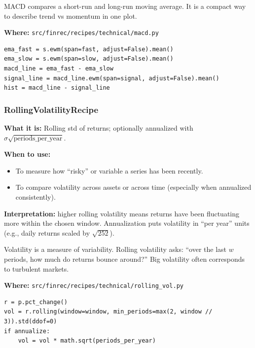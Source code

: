 \documentclass[11pt,a4paper]{article}
\begin{document}
\begin{intuitionbox}
MACD compares a short-run and long-run moving average. It is a compact way to describe trend vs momentum in one plot.
\end{intuitionbox}

\textbf{Where:} \texttt{src/finrec/recipes/technical/macd.py}

\begin{lstlisting}
ema_fast = s.ewm(span=fast, adjust=False).mean()
ema_slow = s.ewm(span=slow, adjust=False).mean()
macd_line = ema_fast - ema_slow
signal_line = macd_line.ewm(span=signal, adjust=False).mean()
hist = macd_line - signal_line
\end{lstlisting}

\subsubsection{RollingVolatilityRecipe}\label{sec:rolling-vol}

\textbf{What it is:} Rolling std of returns; optionally annualized with $\sigma \sqrt{\text{periods\_per\_year}}$.

\textbf{When to use:}
\begin{itemize}[leftmargin=2em]
  \item To measure how ``risky'' or variable a series has been recently.
  \item To compare volatility across assets or across time (especially when annualized consistently).
\end{itemize}

\textbf{Interpretation:} higher rolling volatility means returns have been fluctuating more within the chosen window. Annualization puts volatility in ``per year'' units (e.g., daily returns scaled by \(\sqrt{252}\)).

\begin{intuitionbox}
Volatility is a measure of variability. Rolling volatility asks: ``over the last \(w\) periods, how much do returns bounce around?'' Big volatility often corresponds to turbulent markets.
\end{intuitionbox}

\textbf{Where:} \texttt{src/finrec/recipes/technical/rolling\_vol.py}

\begin{lstlisting}
r = p.pct_change()
vol = r.rolling(window=window, min_periods=max(2, window // 3)).std(ddof=0)
if annualize:
    vol = vol * math.sqrt(periods_per_year)
\end{lstlisting}
\end{document}
